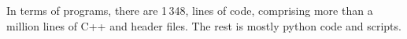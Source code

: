 In terms of programs,
there are 1\,348, lines of code,
comprising more than a million lines of C++ and header files.
The rest is mostly python code and scripts.
